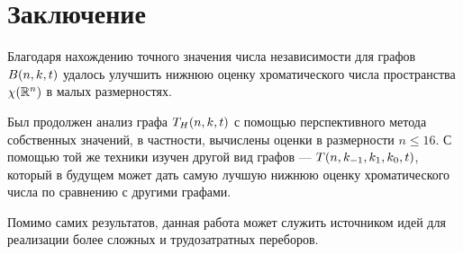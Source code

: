 \section{Заключение}
Благодаря нахождению точного значения числа независимости для графов $B(n,k,t)$
удалось улучшить нижнюю оценку хроматического числа пространства $\chi(\mathbb R^n)$
в малых размерностях.

Был продолжен анализ графа $T_H(n,k,t)$ с помощью перспективного метода
собственных значений, в частности, вычислены оценки в размерности $n \leq 16$.
С помощью той же техники изучен другой вид графов --- $T(n,k_{-1},k_1,k_0,t)$, который в будущем
может дать самую лучшую нижнюю оценку хроматического числа по сравнению с
другими графами.


Помимо самих результатов, данная работа может служить источником идей для
реализации более сложных и трудозатратных переборов.
